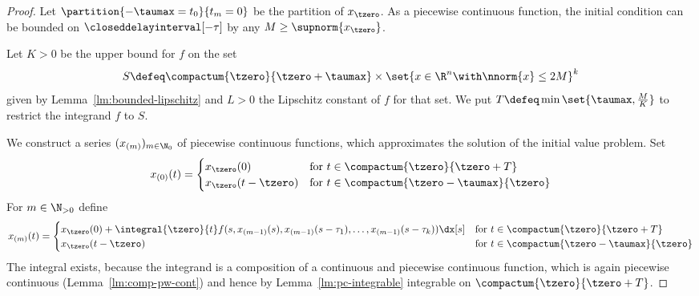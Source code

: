     
    \begin{proof}
        Let $\partition{-\taumax=t_0}{t_m=0}$ be the partition of $x_{\tzero}$. As a piecewise continuous function, the initial condition can be bounded on $\closeddelayinterval[-\tau]$ by any $M\geq \supnorm{x_\tzero}$.
        
        
        Let $K>0$ be the upper bound for $f$ on the set
        \begin{equation*}
            S\defeq\compactum{\tzero}{\tzero+\taumax} \times \set{x\in\R^n\with \nnorm{x}\leq 2M}^k
        \end{equation*}
        given by Lemma~\ref{lm:bounded-lipschitz} and $L>0$ the Lipschitz constant of $f$ for that set.
        We put $T\defeq\min\set{\taumax,\frac{M}{K}}$ to restrict the integrand $f$ to $S$.

        We construct a series $(x_{(m)})_{m\in\N_0}$ of piecewise continuous functions, which approximates the solution of the initial value problem.
        Set
        \begin{equation*}
            x_{(0)}(t)= \begin{cases}
                x_\tzero(0) & \text{for } t\in\compactum{\tzero}{\tzero+T}\\
                x_\tzero(t-\tzero) & \text{for } t\in\compactum{\tzero-\taumax}{\tzero}
            \end{cases}
        \end{equation*}
        For $m\in\N_{>0}$ define
        \begin{equation*}
            x_{(m)}(t)= \begin{cases}
                x_\tzero(0) + \integral{\tzero}{t}
                f(s,x_{(m-1)}(s),x_{(m-1)}(s-\tau_1),\ldots,x_{(m-1)}(s-\tau_k))\dx[s] & \text{for } t\in\compactum{\tzero}{\tzero+T}\\
                x_\tzero(t-\tzero) & \text{for } t\in\compactum{\tzero-\taumax}{\tzero}
            \end{cases}
        \end{equation*}
        The integral exists, because the integrand is a composition of a continuous and piecewise continuous function, which is again piecewise continuous (Lemma~\ref{lm:comp-pw-cont}) and hence by Lemma~\ref{lm:pc-integrable} integrable on $\compactum{\tzero}{\tzero+T}$.


\end{proof}
